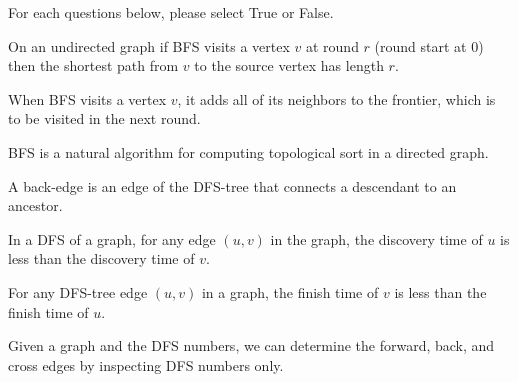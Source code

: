 \begin{problem}
For each questions below, please select True or False.

\asktf

On an undirected graph if  BFS visits a vertex $v$ at round $r$ (round
start at $0$) then the shortest path from $v$ to the source vertex has
length $r$.

\solt

\asktf

When BFS visits a vertex $v$, it adds all of its neighbors to the
frontier, which is to be visited in the next round.

\solf

\asktf

BFS is a natural algorithm for computing topological sort in a directed graph.

\solf


\asktf
A back-edge is an edge of the DFS-tree that connects a descendant to
an ancestor.
\solf

\asktf 

In a DFS of a graph, for any edge $(u,v)$ in the graph, the discovery
time of $u$ is less than the discovery time of $v$.  

\solf

\asktf 
For any DFS-tree edge $(u,v)$ in a graph, the finish time of $v$ is
less than the finish time of $u$.  
\solt

\asktf 
Given a graph and the DFS numbers, we can determine the
forward, back, and cross edges by inspecting DFS numbers only.  
\solt

\end{problem}


